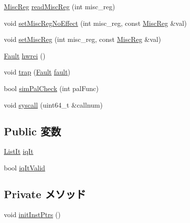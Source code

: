 \begin{DoxyCompactItemize}
\item 
\hyperlink{classOzoneDynInst_aaf5f073a387db0556d1db4bcc45428bc}{MiscReg} \hyperlink{classOzoneDynInst_a34ce48319c94bd2802d790e830357b9c}{readMiscReg} (int misc\_\-reg)
\item 
void \hyperlink{classOzoneDynInst_a763517aaea2f3decbc1ef9d064216b6f}{setMiscRegNoEffect} (int misc\_\-reg, const \hyperlink{classOzoneDynInst_aaf5f073a387db0556d1db4bcc45428bc}{MiscReg} \&val)
\item 
void \hyperlink{classOzoneDynInst_a1877dde4f3eb17a8b7d33ea40176c148}{setMiscReg} (int misc\_\-reg, const \hyperlink{classOzoneDynInst_aaf5f073a387db0556d1db4bcc45428bc}{MiscReg} \&val)
\item 
\hyperlink{classRefCountingPtr}{Fault} \hyperlink{classOzoneDynInst_a5f42e07ae335dff417664e91518c7f1e}{hwrei} ()
\item 
void \hyperlink{classOzoneDynInst_ac74f75adb89c94e4387498067f5567ff}{trap} (\hyperlink{classRefCountingPtr}{Fault} \hyperlink{classBaseDynInst_a68714ceb74c60ea7ef5dec335bb6c5d7}{fault})
\item 
bool \hyperlink{classOzoneDynInst_a461205960be9d52e9beda48a77e9c600}{simPalCheck} (int palFunc)
\item 
void \hyperlink{classOzoneDynInst_afb9b1cbbf52b94f9a2da780a3cc4586b}{syscall} (uint64\_\-t \&callnum)
\end{DoxyCompactItemize}
\subsection*{Public 変数}
\begin{DoxyCompactItemize}
\item 
\hyperlink{classOzoneDynInst_a184cb829e22cc656acb41864f68f51ea}{ListIt} \hyperlink{classOzoneDynInst_a0deec4d5d0af5df075f848b721260166}{iqIt}
\item 
bool \hyperlink{classOzoneDynInst_ad630ef8b639726d89d9efe060a618034}{iqItValid}
\end{DoxyCompactItemize}
\subsection*{Private メソッド}
\begin{DoxyCompactItemize}
\item 
void \hyperlink{classOzoneDynInst_a8a9b6f687d8c5d04a03602a407423179}{initInstPtrs} ()
\end{DoxyCompactItemize}
